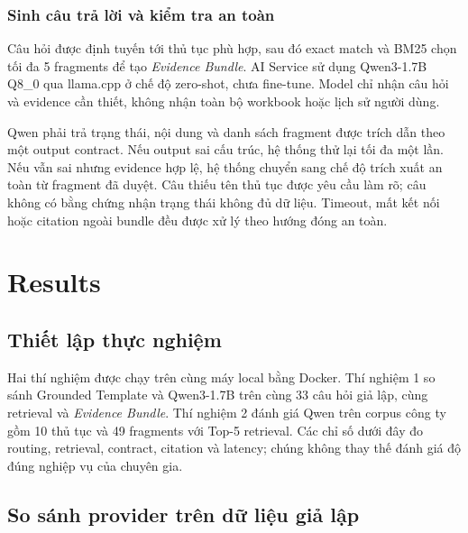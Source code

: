 \documentclass[runningheads]{llncs}
\begin{document}
\subsubsection{Sinh câu trả lời và kiểm tra an toàn}

Câu hỏi được định tuyến tới thủ tục phù hợp, sau đó exact match và BM25 chọn tối
đa 5 fragments để tạo \textit{Evidence Bundle}. AI Service sử dụng
Qwen3-1.7B Q8\_0 qua llama.cpp ở chế độ zero-shot, chưa fine-tune. Model chỉ nhận
câu hỏi và evidence cần thiết, không nhận toàn bộ workbook hoặc lịch sử người
dùng.

Qwen phải trả trạng thái, nội dung và danh sách fragment được trích dẫn theo một
output contract. Nếu output sai cấu trúc, hệ thống thử lại tối đa một lần. Nếu
vẫn sai nhưng evidence hợp lệ, hệ thống chuyển sang chế độ trích xuất an toàn từ
fragment đã duyệt. Câu thiếu tên thủ tục được yêu cầu làm rõ; câu không có bằng
chứng nhận trạng thái không đủ dữ liệu. Timeout, mất kết nối hoặc citation ngoài
bundle đều được xử lý theo hướng đóng an toàn.

\section{Results}

\subsection{Thiết lập thực nghiệm}

Hai thí nghiệm được chạy trên cùng máy local bằng Docker. Thí nghiệm 1 so sánh
Grounded Template và Qwen3-1.7B trên cùng 33 câu hỏi giả lập, cùng retrieval và
\textit{Evidence Bundle}. Thí nghiệm 2 đánh giá Qwen trên corpus công ty gồm 10
thủ tục và 49 fragments với Top-5 retrieval. Các chỉ số dưới đây đo routing,
retrieval, contract, citation và latency; chúng không thay thế đánh giá độ đúng
nghiệp vụ của chuyên gia.

\subsection{So sánh provider trên dữ liệu giả lập}
\end{document}
